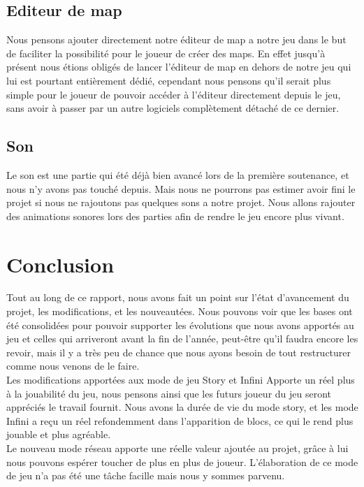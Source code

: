 \documentclass [11pt]{report}
\begin{document}
	\section{Editeur de map}
		Nous pensons ajouter directement notre éditeur de map a notre jeu dans le but de faciliter la possibilité pour le joueur de créer des maps. En effet jusqu'à présent nous étions obligés de lancer l'éditeur de map en dehors de notre jeu qui lui est pourtant entièrement dédié, cependant nous pensons qu'il serait plus simple pour le joueur de pouvoir accéder à l'éditeur directement depuis le jeu, sans avoir à passer par un autre logiciels complètement détaché de ce dernier. 
		
	\section{Son}
		Le son est une partie qui \'et\'e d\'ej\`a bien avanc\'e  lors de la premi\`ere soutenance, et nous n'y avons pas touch\'e depuis. Mais nous ne pourrons pas estimer avoir fini le projet si nous ne rajoutons pas quelques sons a notre projet. Nous allons rajouter des animations sonores lors des parties afin de rendre le jeu encore plus vivant.
		
\chapter*{Conclusion}
	Tout au long de ce rapport, nous avons fait un point sur l'\'etat d'avancement du projet, les modifications, et les nouveaut\'ees. Nous pouvons voir que les bases ont \'et\'e consolid\'ees pour pouvoir supporter les \'evolutions que nous avons apport\'es au jeu et celles qui arriveront avant la fin de l'ann\'ee, peut-\^etre qu'il faudra encore les revoir, mais il y a tr\`es peu de chance que nous ayons besoin de tout restructurer comme nous venons de le faire. \\
	
	Les modifications apport\'ees aux mode de jeu Story et Infini Apporte un r\'eel plus \`a la jouabilit\'e du jeu, nous pensons ainsi que les futurs joueur du jeu seront appr\'eci\'es le travail fournit. Nous avons la dur\'ee de vie du mode story, et les mode Infini a reçu un r\'eel refondemment dans l'apparition de blocs, ce qui le rend plus jouable et plus agr\'eable.\\
	
	Le nouveau mode r\'eseau apporte une r\'eelle valeur ajout\'ee au projet, gr\^ace \`a lui nous pouvons esp\'erer toucher de plus en plus de joueur. L'\'elaboration de ce mode de jeu n'a pas \'et\'e une t\^ache facille mais nous y sommes parvenu.\\
	
\end{document}
